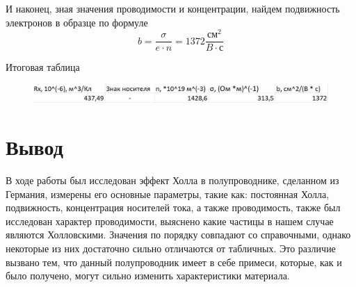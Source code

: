 \documentclass[a4paper,12pt]{article}
\begin{document}
И наконец, зная значения проводимости и концентрации, найдем подвижность электронов в образце по формуле
\[b = \frac{\sigma}{e \cdot n} = 1372 \frac{\text{см}^2}{B \cdot \text{с}} \]

Итоговая таблица

\begin{figure}[H]
	\begin{center}	\includegraphics[width=1\textwidth]{tabliza4.jpg}
	\end{center}
\end{figure}
\section{Вывод}
В ходе работы был исследован эффект Холла в полупроводнике, сделанном из Германия, измерены его основные параметры, такие как: постоянная Холла, подвижность, концентрация носителей тока, а также проводимость, также был исследован характер проводимости, выяснено какие частицы в нашем случае являются Холловскими. Значения по порядку совпадают со справочными, однако некоторые из них достаточно сильно отличаются от табличных. Это различие вызвано тем, что данный полупроводник имеет в себе примеси, которые, как и было получено, могут сильно изменить характеристики материала.
\end{document}
